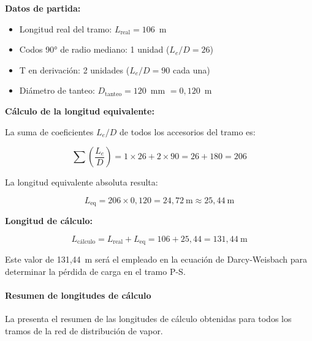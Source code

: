 \documentclass[12pt]{article}
\begin{document}
\textbf{Datos de partida:}
\begin{itemize}[leftmargin=2em]
	\item Longitud real del tramo: $L_{\text{real}} = 106$~m
	\item Codos 90° de radio mediano: 1 unidad ($L_e/D = 26$)
	\item T en derivación: 2 unidades ($L_e/D = 90$ cada una)
	\item Diámetro de tanteo: $D_{\text{tanteo}} = 120$~mm $= 0{,}120$~m
\end{itemize}

\textbf{Cálculo de la longitud equivalente:}

La suma de coeficientes $L_e/D$ de todos los accesorios del tramo es:

\begin{equation}
	\sum \left(\frac{L_e}{D}\right) = 1 \times 26 + 2 \times 90 = 26 + 180 = 206
	\label{eq:suma-LeD-PS}
\end{equation}

La longitud equivalente absoluta resulta:

\begin{equation}
	L_{\text{eq}} = 206 \times 0{,}120 = 24{,}72 \ \text{m} \approx 25{,}44 \ \text{m}
	\label{eq:Leq-PS}
\end{equation}

\textbf{Longitud de cálculo:}

\begin{equation}
	L_{\text{cálculo}} = L_{\text{real}} + L_{\text{eq}} = 106 + 25{,}44 = 131{,}44 \ \text{m}
	\label{eq:Lcalculo-PS}
\end{equation}

Este valor de 131,44~m será el empleado en la ecuación de Darcy-Weisbach para determinar la pérdida de carga en el tramo P-S.

\paragraph{Resumen de longitudes de cálculo}

La  presenta el resumen de las longitudes de cálculo obtenidas para todos los tramos de la red de distribución de vapor.
\end{document}
